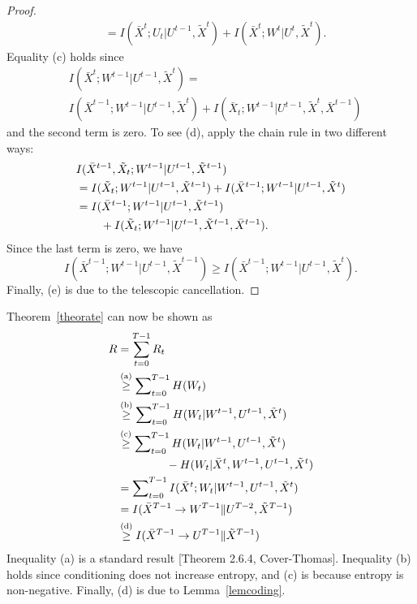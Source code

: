 \begin{proof}
\begin{align*}
&=I(\bar{X}^t; U_t|U^{t-1}, \tilde{X}^t)+I(\bar{X}^t;W^t|U^t, \tilde{X}^t).
\end{align*}
Equality (c) holds since
\begin{align*}
&I(\bar{X}^t; W^{t-1}|U^{t-1}, \tilde{X}^t)=\\
&I(\bar{X}^{t-1}; W^{t-1}|U^{t-1}, \tilde{X}^t)+I(\bar{X}_t; W^{t-1}|U^{t-1}, \tilde{X}^t, \bar{X}^{t-1})
\end{align*}
and the second term is zero. To see (d), apply the chain rule in two different ways:
\begin{align*}
&I(\bar{X}^{t-1}, \tilde{X}_t; W^{t-1}|U^{t-1},\tilde{X}^{t-1}) \\
&=I(\tilde{X}_t; W^{t-1}|U^{t-1}, \tilde{X}^{t-1})+I(\bar{X}^{t-1}; W^{t-1}|U^{t-1}, \tilde{X}^t) \\
&=I(\bar{X}^{t-1}; W^{t-1}|U^{t-1}, \tilde{X}^{t-1}) \\
&\hspace{5ex}+I(\tilde{X}_t;W^{t-1}|U^{t-1},\tilde{X}^{t-1}, \bar{X}^{t-1}).
\end{align*}
Since the last term is zero, we have 
\[
I(\bar{X}^{t-1}; W^{t-1}|U^{t-1}, \tilde{X}^{t-1}) \geq I(\bar{X}^{t-1}; W^{t-1}|U^{t-1}, \tilde{X}^t).
\]
Finally, (e) is due to the telescopic cancellation.
\end{proof}

Theorem~\ref{theorate} can now be shown as
\begin{align*}
R&=\sum_{t=0}^{T-1} R_t \\
&\stackrel{\text{(a)}}{\geq} \sum\nolimits_{t=0}^{T-1} H(W_t) \\
&\stackrel{\text{(b)}}{\geq} \sum\nolimits_{t=0}^{T-1} H(W_t|W^{t-1}, U^{t-1}, \tilde{X}^t) \\
&\stackrel{\text{(c)}}{\geq} \sum\nolimits_{t=0}^{T-1} H(W_t|W^{t-1}, U^{t-1}, \tilde{X}^t) \\
&\hspace{10ex}-H(W_t|\bar{X}^t, W^{t-1}, U^{t-1}, \tilde{X}^t) \\
&=\sum\nolimits_{t=0}^{T-1} I(\bar{X}^t; W_t|W^{t-1}, U^{t-1}, \tilde{X}^t) \\
&=I(\bar{X}^{T-1}\rightarrow W^{T-1}\| U^{T-2}, \tilde{X}^{T-1}) \\
&\stackrel{\text{(d)}}{\geq} I(\bar{X}^{T-1}\rightarrow U^{T-1}\| \tilde{X}^{T-1})
\end{align*}
Inequality (a) is a standard result [Theorem 2.6.4, Cover-Thomas]. Inequality (b) holds since conditioning does not increase entropy, and (c) is because entropy is non-negative. Finally, (d) is due to Lemma~\ref{lemcoding}.

